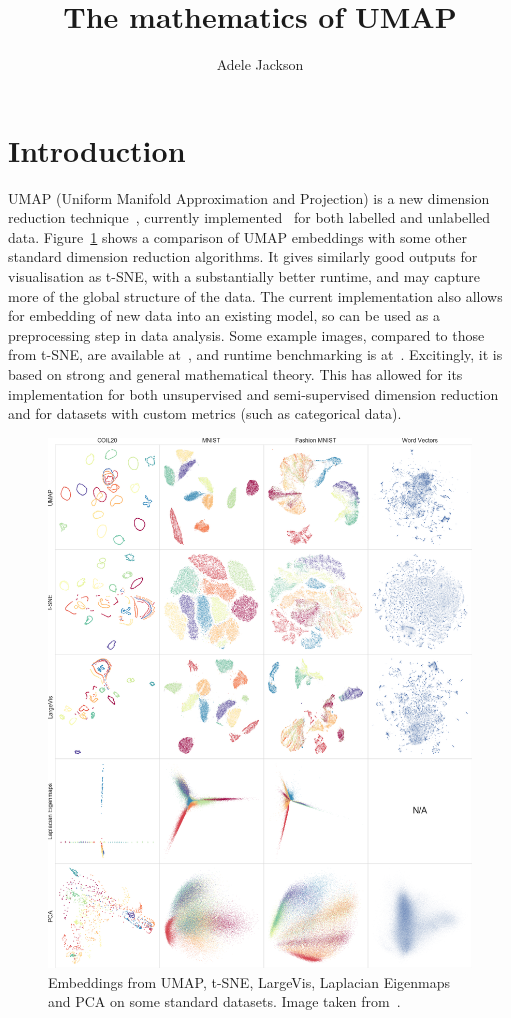 \documentclass[a4paper,11pt,leqno]{article} \usepackage{amsmath}
\title{The mathematics of UMAP} \author{Adele Jackson}
\theoremstyle{definition} \newtheorem{defn}{Definition}
\begin{document}
 \thispagestyle{empty} \maketitle


\section{Introduction} UMAP (Uniform Manifold Approximation and Projection) is
a new dimension reduction technique~\cite{McInnes18}, currently
implemented~\cite{McInnesGithub, MelvilleGithub} for both labelled and
unlabelled data.  Figure~\ref{fig_example_embedding} shows a comparison of UMAP
embeddings with some other standard dimension reduction algorithms.  It gives
similarly good outputs for visualisation as t-SNE, with a substantially better
runtime, and may capture more of the global structure of the data.  The current
implementation also allows for embedding of new data into an existing model, so
can be used as a preprocessing step in data analysis.  Some example images,
compared to those from t-SNE, are available at~\cite{Melville}, and runtime
benchmarking is at~\cite{McInnesBenchmarking}.  Excitingly, it is based on
strong and general mathematical theory.  This has allowed for its implementation
for both unsupervised and semi-supervised dimension reduction and for datasets
with custom metrics (such as categorical data).

\begin{figure} \centering
  \includegraphics[width=1.05\textwidth]{figures/dim-red-comparison-nips.png}
  \caption{Embeddings from UMAP, t-SNE, LargeVis, Laplacian Eigenmaps and PCA on
  some standard datasets. Image taken from~\cite{McInnes18}.}
  \label{fig_example_embedding} \end{figure}
\end{document}
